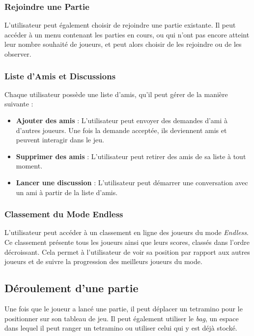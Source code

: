 \documentclass{report}
\begin{document}
\subsubsection{Rejoindre une Partie}

\noindent L'utilisateur peut également choisir de rejoindre une partie existante. Il peut accéder à un menu contenant les parties en cours, ou qui n'ont pas encore atteint leur nombre souhaité de joueurs, et peut alors choisir de les rejoindre ou de les observer.


\subsubsection{Liste d'Amis et Discussions}

\noindent Chaque utilisateur possède une liste d'amis, qu'il peut gérer de la manière suivante :

\begin{itemize}
    \item \textbf{Ajouter des amis} : L'utilisateur peut envoyer des demandes d'ami à d'autres joueurs. Une fois la demande acceptée, ils deviennent amis et peuvent interagir dans le jeu.
    \item \textbf{Supprimer des amis} : L'utilisateur peut retirer des amis de sa liste à tout moment.
    \item \textbf{Lancer une discussion} : L'utilisateur peut démarrer une conversation avec un ami à partir de la liste d'amis.
\end{itemize}

\subsubsection{Classement du Mode Endless}

\noindent L'utilisateur peut accéder à un classement en ligne des joueurs du mode \emph{Endless}. Ce classement présente tous les joueurs ainsi que leurs scores, classés dans l'ordre décroissant. Cela permet à l'utilisateur de voir sa position par rapport aux autres joueurs et de suivre la progression des meilleurs joueurs du mode.





\subsection{Déroulement d’une partie}

\noindent Une fois que le joueur a lancé une partie, il peut déplacer un tetramino pour le positionner sur son tableau de jeu. Il peut également utiliser le \emph{bag}, un espace dans lequel il peut ranger un tetramino ou utiliser celui qui y est déjà stocké. \\
\end{document}
